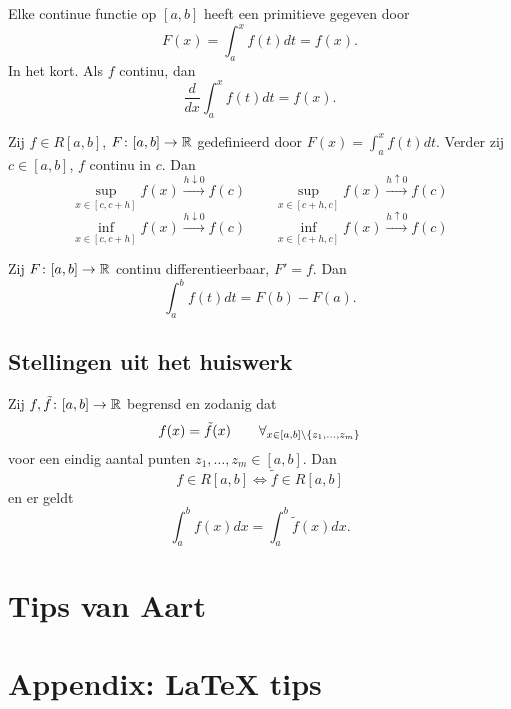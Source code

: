 \documentclass{2wa40summary}
\begin{document}
			\begin{gevolg}
				Elke continue functie op $ [a,b] $ heeft een primitieve gegeven door 
				\[ 
					F(x)= \int_a^x f(t)dt = f(x).
				 \]
				 In het kort. Als $f$ continu, dan 
				 \[ 
					 \frac{d}{dx} \int_a^x f(t)dt = f(x).
				  \]
			\end{gevolg}
			
			\begin{lemma}
				Zij $ f \in R[a,b] $, $F\colon [a,b] \to \mathbb{R}$ gedefinieerd door $ F(x) = \int_a^x f(t)dt $. Verder zij $ c \in [a,b] $, $f$ continu in $c$. Dan
				\[ 
					\sup_{x \in [c,c+h]} f(x) \xrightarrow{h \downarrow 0} f(c)
					\qquad
					\sup_{x \in [c+h,c]} f(x) \xrightarrow{h \uparrow 0} f(c)
				 \]
				 \[ 
					\inf_{x \in [c,c+h]} f(x) \xrightarrow{h \downarrow 0} f(c)
					\qquad
					\inf_{x \in [c+h,c]} f(x) \xrightarrow{h \uparrow 0} f(c)
				  \]
			\end{lemma}
			
			\begin{theorem}
				Zij $ F\colon [a,b] \to \mathbb{R} $ continu differentieerbaar, $ F'=f $. Dan
				\[ 
					\int_a^b f(t)dt = F(b)-F(a).
				 \]
			\end{theorem}
			
		\subsection{Stellingen uit het huiswerk}
			\begin{theorem}
				Zij $ f, \tilde f \colon [a,b] \to \mathbb{R} $ begrensd en zodanig dat 
				\[ 
					f(x) = \tilde f(x) \qquad \forall_{x \in [a,b] \backslash\lbrace z_1, \ldots, z_m\rbrace}
				 \]
				 voor een eindig aantal punten $ z_1, \ldots, z_m \in [a,b] $. Dan
				 \[ 
					 f \in R[a,b] \iff \tilde f \in R[a,b]
				  \]
				  en er geldt
				  \[ 
					  \int_a^b f(x)dx = \int_a^b \tilde f(x)dx.
				   \]
			\end{theorem}
		
		\newpage
		\section{Tips van Aart}			
%		
		
		
		
		
		\newpage
		
		\appendix
		\section{Appendix: LaTeX tips}
		
\end{document}
